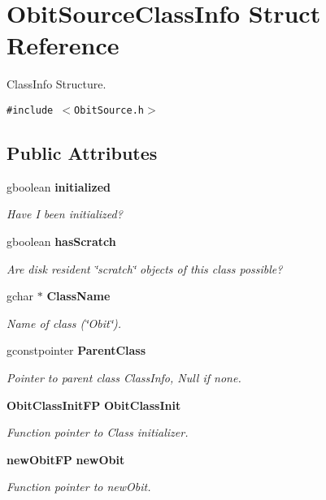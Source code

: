 \section{Obit\-Source\-Class\-Info Struct Reference}
\label{structObitSourceClassInfo}
Class\-Info Structure.  


{\tt \#include $<$Obit\-Source.h$>$}

\subsection*{Public Attributes}
\begin{CompactItemize}
\item 
gboolean {\bf initialized}
\begin{CompactList}\small\item\em Have I been initialized? \item\end{CompactList}\item 
gboolean {\bf has\-Scratch}
\begin{CompactList}\small\item\em Are disk resident \char`\"{}scratch\char`\"{} objects of this class possible? \item\end{CompactList}\item 
gchar $\ast$ {\bf Class\-Name}
\begin{CompactList}\small\item\em Name of class (\char`\"{}Obit\char`\"{}). \item\end{CompactList}\item 
gconstpointer {\bf Parent\-Class}
\begin{CompactList}\small\item\em Pointer to parent class Class\-Info, Null if none. \item\end{CompactList}\item 
{\bf Obit\-Class\-Init\-FP} {\bf Obit\-Class\-Init}
\begin{CompactList}\small\item\em Function pointer to Class initializer. \item\end{CompactList}\item 
{\bf new\-Obit\-FP} {\bf new\-Obit}
\begin{CompactList}\small\item\em Function pointer to new\-Obit. \item\end{CompactList}\item 

\end{CompactItemize}
